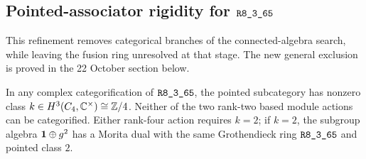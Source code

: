 \subsection{Pointed-associator rigidity for \texorpdfstring{$\sha{R8_3_65}$}{R8-3-65}}
\label{sec:r65-pointed-associator-next}
This refinement removes categorical branches of the connected-algebra
search, while leaving the fusion ring unresolved at that stage. The new general exclusion is proved in the 22 October section below.

\begin{proposition}
In any complex categorification of $\sha{R8_3_65}$, the pointed subcategory
has nonzero class $k\in H^3(C_4,\mathbb C^\times)\cong\mathbb Z/4$.
Neither of the two rank-two based module actions can be categorified.
Either rank-four action requires $k=2$; if $k=2$, the subgroup algebra
$\mathbf1\oplus g^2$ has a Morita dual with the same Grothendieck ring
$\sha{R8_3_65}$ and pointed class $2$.
\end{proposition}
